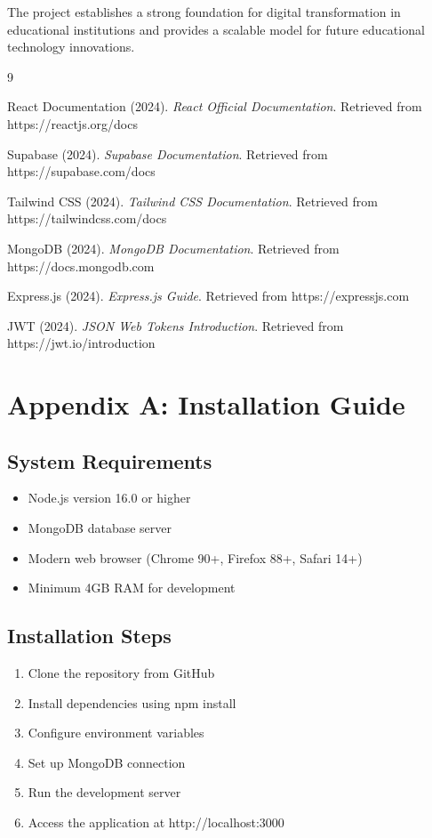 The project establishes a strong foundation for digital transformation in educational institutions and provides a scalable model for future educational technology innovations.

\newpage
\begin{thebibliography}{9}

React Documentation (2024). \textit{React Official Documentation}. Retrieved from https://reactjs.org/docs

Supabase (2024). \textit{Supabase Documentation}. Retrieved from https://supabase.com/docs

Tailwind CSS (2024). \textit{Tailwind CSS Documentation}. Retrieved from https://tailwindcss.com/docs

MongoDB (2024). \textit{MongoDB Documentation}. Retrieved from https://docs.mongodb.com

Express.js (2024). \textit{Express.js Guide}. Retrieved from https://expressjs.com

JWT (2024). \textit{JSON Web Tokens Introduction}. Retrieved from https://jwt.io/introduction

\end{thebibliography}

\newpage
\section*{Appendix A: Installation Guide}

\subsection*{System Requirements}
\begin{itemize}
\item Node.js version 16.0 or higher
\item MongoDB database server
\item Modern web browser (Chrome 90+, Firefox 88+, Safari 14+)
\item Minimum 4GB RAM for development
\end{itemize}

\subsection*{Installation Steps}
\begin{enumerate}
\item Clone the repository from GitHub
\item Install dependencies using npm install
\item Configure environment variables
\item Set up MongoDB connection
\item Run the development server
\item Access the application at http://localhost:3000
\end{enumerate}

